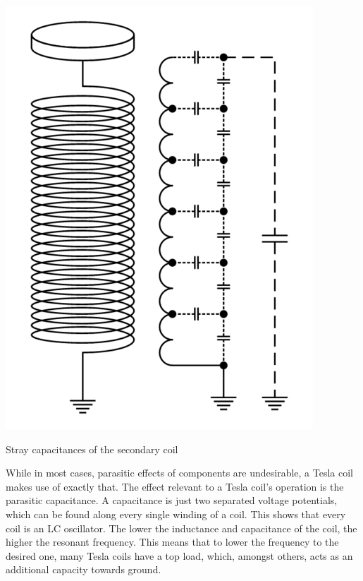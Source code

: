 \begin{marginfigure}[*-5]
\includegraphics[width=\textwidth]{simon/resources/teslaCoilStrayCapacitance.png}
\caption{Stray capacitances of the secondary coil}
\end{marginfigure}

While in most cases, parasitic effects of components are undesirable, a Tesla coil makes use of exactly that. The effect relevant to a Tesla coil's operation is the parasitic capacitance. A capacitance is just two separated voltage potentials, which can be found along every single winding of a coil. This shows that every coil is an LC oscillator. The lower the inductance and capacitance of the coil, the higher the resonant frequency. This means that to lower the frequency to the desired one, many Tesla coils have a top load, which, amongst others, acts as an additional capacity towards ground.


